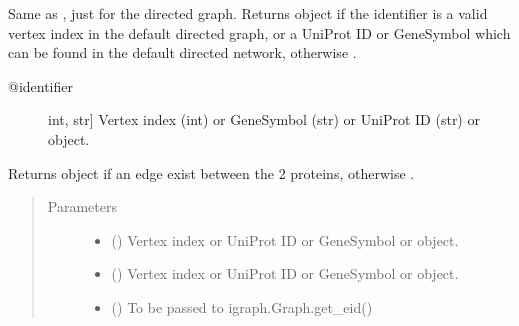\documentclass[letterpaper,10pt,english]{sphinxmanual}
\begin{document}
\begin{fulllineitems}
\begin{fulllineitems}
\label{\detokenize{main:pypath.main.PyPath.protein}}
Same as , just for the directed graph.
Returns  object if the identifier
is a valid vertex index in the default directed graph,
or a UniProt ID or GeneSymbol which can be found in the
default directed network, otherwise .
\begin{description}
\item[{@identifier}] \leavevmode{[}int, str{]}
Vertex index (int) or GeneSymbol (str) or UniProt ID (str) or
 object.

\end{description}

\end{fulllineitems}


\begin{fulllineitems}
\label{\detokenize{main:pypath.main.PyPath.protein_edge}}
Returns  object if an edge exist between
the 2 proteins, otherwise .
\begin{quote}\begin{description}
\item[{Parameters}] \leavevmode\begin{itemize}
\item {} 
 (\sphinxstyleliteralemphasis{\sphinxupquote{,}}) \textendash{} Vertex index or UniProt ID or GeneSymbol or 
object.

\item {} 
 (\sphinxstyleliteralemphasis{\sphinxupquote{,}}) \textendash{} Vertex index or UniProt ID or GeneSymbol or 
object.

\item {} 
 () \textendash{} To be passed to igraph.Graph.get\_eid()


\end{itemize}
\end{description}
\end{quote}
\end{fulllineitems}
\end{fulllineitems}
\end{document}
